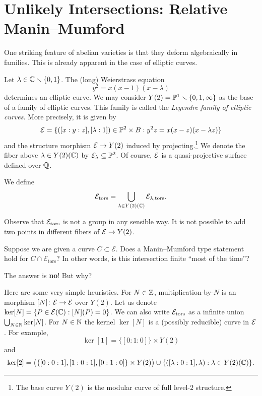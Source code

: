 \chapter{Unlikely Intersections: Relative Manin--Mumford}

One striking feature of abelian varieties is that they deform
algebraically in families. This is already apparent in the case of
elliptic curves.

\begin{example}
  \label{ex:relmm}
  Let $\lambda\in {\mathbb{C}}\smallsetminus\{0,1\}$. The (long) Weierstrass equation
  \begin{equation*}
    y^2 = x(x-1)(x-\lambda)
  \end{equation*}
  determines an elliptic curve. We may consider
  $Y(2) = {\mathbb{P}}^1\smallsetminus\{0,1,\infty\}$ as the base of a family of elliptic
  curves. This family is called the \emph{Legendre family of elliptic
  curves}. More precisely, it is given by
  \begin{equation*}
    {\mathcal E}=\{([x:y:z], [\lambda:1]) \in {\mathbb{P}}^2 \times B : y^2z =
    x(x-z)(x-\lambda z)\}
  \end{equation*}
  and the structure morphism ${\mathcal E}\rightarrow Y(2)$ induced by
  projecting.\footnote{The base curve $Y(2)$ is the modular curve of full level-$2$
  structure.} 
  We denote the fiber above $\lambda\in Y(2)({\mathbb{C}})$  by ${\mathcal E}_\lambda
  \subseteq{\mathbb{P}}^2$.
  Of course, ${\mathcal E}$ is a quasi-projective surface defined over ${\mathbb{Q}}$.
  
  We define
  \begin{equation*}
    {\mathcal E}_{\mathrm{tors}} = \bigcup_{\lambda\in Y(2)({\mathbb{C}})}
    {\mathcal E}_{\lambda,\mathrm{tors}}. 
  \end{equation*}

  Observe that ${\mathcal E}_{\mathrm{tors}}$ is not a group in any sensible
  way. It is not possible to add two points in different fibers of
  ${\mathcal E}\rightarrow Y(2)$.
  
  Suppose we are given a curve $C\subset \mathcal{E}$. Does a
  Manin--Mumford type statement hold for $C\cap
  \mathcal{E}_{\mathrm{tors}}$? In other words, is this intersection
  finite ``most of the time''?

  The answer is \textbf{no}! But why?

  Here are some very simple  heuristics. For $N\in{\mathbb{Z}}$,  multiplication-by-$N$ is an
  morphism
  $[N]\colon {\mathcal E}\rightarrow{\mathcal E}$ over $Y(2)$.
  Let us denote $\ker [N] = \{P \in {\mathcal E}({\mathbb{C}}): [N](P)=0\}$. 
  We can also write
  ${\mathcal E}_{\mathrm{tors}}$ as a infinite union
  $\bigcup_{N\in{\mathbb{N}}}\ker[N]$.
  For $N\in{\mathbb{N}}$ the kernel  $\ker[N]$ is a (possibly reducible) curve
  in ${\mathcal E}$. For example,
  \begin{equation*}
    \ker [1] = \{[0:1:0]\}\times Y(2)
  \end{equation*}
  and
  \begin{equation*}
    \ker[2] = \bigl(\{[0:0:1],[1:0:1],[0:1:0]\}\times Y(2)\bigr)\cup
    \{([\lambda:0:1],\lambda) : \lambda \in Y(2)({\mathbb{C}})\}. 
  \end{equation*}


\end{example}
